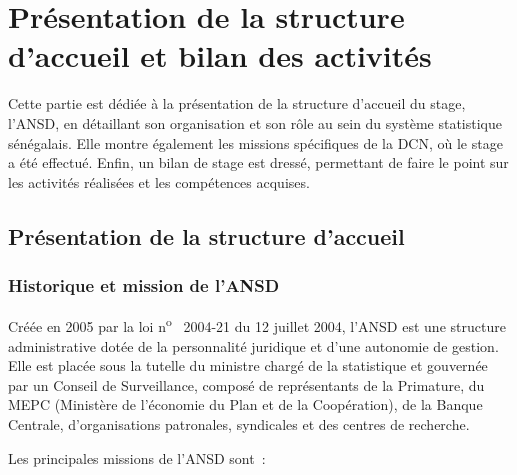 \documentclass[12pt,a4paper,oneside]{report}
\begin{document}
\par
\endgroup

\chapter{Présentation de la structure d'accueil et bilan des activités}

\begin{introductionchapitre}
Cette partie est dédiée à la présentation de la structure d’accueil du stage, l’ANSD, en détaillant son
organisation et son rôle au sein du système statistique sénégalais. Elle montre également les missions
spécifiques de la DCN, où le stage a été effectué. Enfin, un bilan de stage est dressé, permettant de faire le
point sur les activités réalisées et les compétences acquises.
\end{introductionchapitre}

\section{Présentation de la structure d'accueil}

\subsection{Historique et mission de l’ANSD}

Créée en 2005 par la loi n\textsuperscript{o}~ 2004-21 du 12 juillet 2004, l’ANSD est une structure
administrative dotée de la personnalité juridique et d’une autonomie de gestion. Elle est placée sous la
tutelle du ministre chargé de la statistique et gouvernée par un Conseil de Surveillance, composé de
représentants de la Primature, du MEPC (Ministère de l’économie du Plan et de la Coopération), de la Banque
Centrale, d’organisations patronales, syndicales et des centres de recherche.

Les principales missions de l’ANSD sont~:
\end{document}
